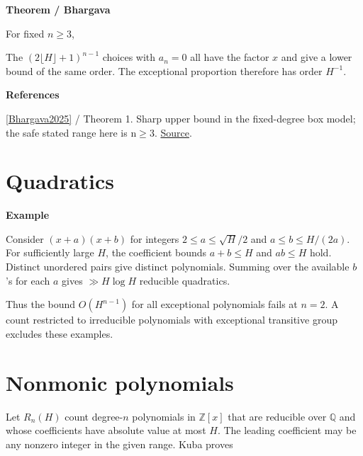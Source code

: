 \documentclass[11pt,a4paper,oneside,openany]{book}
\newcommand{\atlasdisplay}[1]{\par\begingroup\centering\vspace{3pt}\noindent\adjustbox{max width=\linewidth}{\(\displaystyle #1\)}\par\vspace{5pt}\endgroup}
\newenvironment{sources}{\par\smallskip\begingroup\footnotesize\color{atlasgray}\leftskip=10pt\setlength{\parskip}{2pt}}{\par\endgroup\smallskip}
\begin{document}
\begin{atlasblock}[standard]
\textbf{\sffamily Theorem  /  Bhargava}\par\smallskip
\color{black} For fixed \(n\ge3\),\par

\atlasdisplay{E_n(H)=O_n(H^{n-1}).}
\end{atlasblock}\color{black}
\color{black} The \((2\lfloor H\rfloor+1)^{n-1}\) choices with \(a_n=0\) all have the factor \(x\) and give a lower bound of the same order. The exceptional proportion therefore has order \(H^{-1}\).\par
\begin{sources}
\textbf{References}\par\smallskip
\noindent\hyperlink{ref:Bhargava2025}{[Bhargava2025]} / Theorem 1. Sharp upper bound in the fixed-degree box model; the safe stated range here is n\ensuremath{\ge}3. \href{https://annals.math.princeton.edu/2025/201-2/p01}{Source}.\par
\end{sources}\color{black}
\section{Quadratics}

\begin{atlasblock}[standard]
\textbf{\sffamily Example}\par\smallskip
\color{black} Consider \((x+a)(x+b)\) for integers \(2\le a\le\sqrt H/2\) and \(a\le b\le H/(2a)\). For sufficiently large \(H\), the coefficient bounds \(a+b\le H\) and \(ab\le H\) hold. Distinct unordered pairs give distinct polynomials. Summing over the available \(b\)'s for each \(a\) gives \(\gg H\log H\) reducible quadratics.\par
\end{atlasblock}\color{black}
\color{black} Thus the bound \(O(H^{n-1})\) for all exceptional polynomials fails at \(n=2\). A count restricted to irreducible polynomials with exceptional transitive group excludes these examples.\par
{}\section{Nonmonic polynomials}
\color{black} Let \(R_n(H)\) count degree-\(n\) polynomials in \(\mathbb Z[x]\) that are reducible over \(\mathbb Q\) and whose coefficients have absolute value at most \(H\). The leading coefficient may be any nonzero integer in the given range. Kuba proves\par
\end{document}
